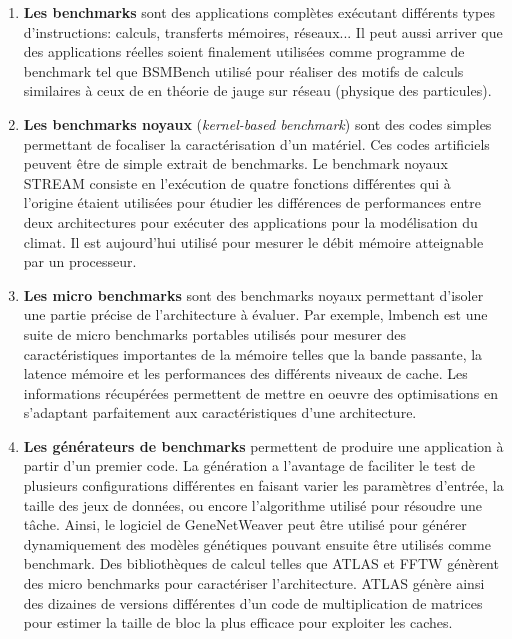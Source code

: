         \begin{enumerate}

            \item  \textbf{Les benchmarks} sont des applications complètes exécutant différents types d'instructions: calculs, transferts mémoires, réseaux... Il peut aussi arriver que des applications réelles soient finalement utilisées comme programme de benchmark tel que BSMBench \cite{HPC:bsmbench} utilisé pour réaliser des motifs de calculs similaires à ceux de en théorie de jauge sur réseau (physique des particules).
        
            \item  \textbf{Les benchmarks noyaux} (\textit{kernel-based benchmark}) sont des codes simples permettant de focaliser la caractérisation d'un matériel. Ces codes artificiels peuvent être de simple extrait de benchmarks. Le benchmark noyaux STREAM consiste en l'exécution de quatre fonctions différentes qui à l'origine étaient utilisées pour étudier les différences de performances entre deux architectures pour exécuter des applications pour la modélisation du climat. Il est aujourd'hui utilisé pour mesurer le débit mémoire atteignable par un processeur.
        
            \item \textbf{Les micro benchmarks} sont des benchmarks noyaux permettant d’isoler une partie précise de l’architecture à évaluer. Par exemple, lmbench \cite{HPC:lmbench} est une suite de micro benchmarks portables utilisés pour mesurer des caractéristiques importantes de la mémoire telles que la bande passante, la latence mémoire et les performances des différents niveaux de cache.  Les informations récupérées permettent de mettre en oeuvre des optimisations en s'adaptant parfaitement aux caractéristiques d'une architecture.
      
            \item \textbf{Les générateurs de benchmarks} permettent de produire une application à partir d'un premier code. La génération a l'avantage de faciliter le test de plusieurs configurations différentes en faisant varier les paramètres d'entrée, la taille des jeux de données, ou encore l'algorithme utilisé pour résoudre une tâche. Ainsi, le logiciel de GeneNetWeaver \cite{schaffter2011genenetweaver} peut être utilisé pour générer dynamiquement des modèles génétiques pouvant ensuite être utilisés comme benchmark. Des bibliothèques de calcul telles que ATLAS \cite{whaley1998automatically} et FFTW \cite{frigo1998fftw} génèrent des micro benchmarks pour caractériser l'architecture. ATLAS génère ainsi des dizaines de versions différentes d'un code de multiplication de matrices pour estimer la taille de bloc la plus efficace pour exploiter les caches.
        \end{enumerate}    
   
